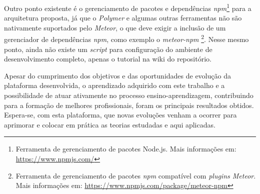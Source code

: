 Outro ponto existente é o gerenciamento de pacotes e dependências \textit{npm}\footnote{Ferramenta de gerenciamento de pacotes Node.js. Mais informações em: \url{https://www.npmjs.com/}} para a arquitetura proposta, já que o \textit{Polymer} e algumas outras ferramentas não são nativamente suportados pelo \textit{Meteor}, o que deve exigir a inclusão de um gerenciador de dependências \textit{npm}, como exemplo o \textit{meteor-npm} \footnote{Ferramenta de gerenciamento de pacotes \textit{npm} compatível com \textit{plugins Meteor}. Mais informações em: \url{https://www.npmjs.com/package/meteor-npm}}. Nesse mesmo ponto, ainda não existe um \textit{script} para configuração do ambiente de desenvolvimento completo, apenas o tutorial na wiki do repositório. 

Apesar do cumprimento dos objetivos e das oportunidades de evolução da plataforma desenvolvida, o aprendizado adquirido com este trabalho e a possibilidade de atuar ativamente no processo ensino-aprendizagem, contribuindo para a formação de melhores profissionais, foram os principais resultados obtidos. Espera-se, com esta plataforma, que novas evoluções venham a ocorrer para aprimorar e colocar em prática as teorias estudadas e aqui aplicadas.
